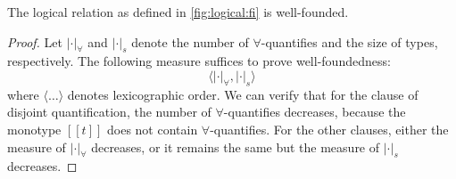 \begin{lemma}
  The logical relation as defined in \cref{fig:logical:fi} is well-founded.
\end{lemma}
\begin{proof}
  Let $| \cdot |_{\forall}$ and $| \cdot |_s$ denote the number of
  $\forall$-quantifies and the size of types, respectively. The following
  measure suffices to prove well-foundedness:
  \[
\langle | \cdot |_{\forall} ,  | \cdot |_s   \rangle
  \]
  where $\langle \dots \rangle$ denotes lexicographic order. We can verify that
  for the clause of disjoint quantification, the number of $\forall$-quantifies
  decreases, because the monotype $[[t]]$ does not contain $\forall$-quantifies.
  For the other clauses, either the measure of $| \cdot |_{\forall}$ decreases,
  or it remains the same but the measure of $| \cdot |_s$ decreases.
\end{proof}









